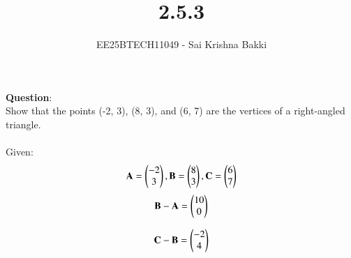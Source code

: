 \documentclass[journal]{IEEEtran}
\begin{document}

\vspace{3cm}

\title{2.5.3}
\author{EE25BTECH11049 - Sai Krishna Bakki}
 \maketitle
{\let\newpage\relax\maketitle}

\renewcommand{\thefigure}{\theenumi}
\renewcommand{\thetable}{\theenumi}
\setlength{\intextsep}{10pt} %


\renewcommand{\thetable}{\theenumi}

\textbf{Question}:\\
Show that the points (-2, 3), (8, 3), and (6, 7) are the vertices of a right-angled triangle. \\ 
\solution \\
Given:
\begin{align}
 \mathbf{A}=\begin{pmatrix}-2\\3\end{pmatrix},
 \mathbf{B}=\begin{pmatrix}8\\3\end{pmatrix},
 \mathbf{C}=\begin{pmatrix}6\\7\end{pmatrix}
\end{align} 
\begin{align}
   \mathbf{B}-\mathbf{A}=\begin{pmatrix}10\\0\end{pmatrix}
\end{align}

\begin{align}
   \mathbf{C}-\mathbf{B}=\begin{pmatrix}-2\\4\end{pmatrix}
\end{align}
\end{document}
